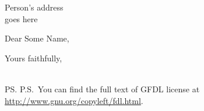 \documentclass{letter}
\begin{document}
%
    \begin{letter}{
    Person's address\\
    goes here
    }%
        \opening{Dear Some Name,}
        \lipsum[1-7]     
        
        
        
		\closing{Yours faithfully,\\
			 \\	
		}

\ps{P.S.~You can find the full text of GFDL license at
\url{http://www.gnu.org/copyleft/fdl.html}.}

     
    \end{letter}%
\end{document}
